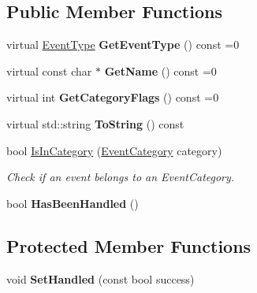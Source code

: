 \subsection*{Public Member Functions}
\begin{DoxyCompactItemize}
\item 
\mbox{\label{classengine_1_1events_1_1Event_a99604df0759386f2cea0071efa52d6e9}} 
virtual \hyperlink{Event_8h_a10b3e1cfc8aaa02ff37fd47f0fae2b8a}{Event\+Type} {\bfseries Get\+Event\+Type} () const =0
\item 
\mbox{\label{classengine_1_1events_1_1Event_a11bf339abb972f3c06f1cf20a0ff894b}} 
virtual const char $\ast$ {\bfseries Get\+Name} () const =0
\item 
\mbox{\label{classengine_1_1events_1_1Event_a24e56efda02b259ac08ecc5ade26963d}} 
virtual int {\bfseries Get\+Category\+Flags} () const =0
\item 
\mbox{\label{classengine_1_1events_1_1Event_afad3baa55387283c7cfe692292edc269}} 
virtual std\+::string {\bfseries To\+String} () const
\item 
bool \hyperlink{classengine_1_1events_1_1Event_abf217454944fb4cceb6dee40d886a0c4}{Is\+In\+Category} (\hyperlink{Event_8h_a1e3bf91397b8a47069494aede2669474}{Event\+Category} category)
\begin{DoxyCompactList}\small\item\em Check if an event belongs to an Event\+Category. \end{DoxyCompactList}\item 
\mbox{\label{classengine_1_1events_1_1Event_a39202ff693f2701f2f736dfd0b4f3878}} 
bool {\bfseries Has\+Been\+Handled} ()
\end{DoxyCompactItemize}
\subsection*{Protected Member Functions}
\begin{DoxyCompactItemize}
\item 
\mbox{\label{classengine_1_1events_1_1Event_aa85c36143880a3312b1c63166463ef5d}} 
void {\bfseries Set\+Handled} (const bool success)
\end{DoxyCompactItemize}
